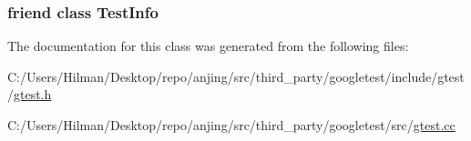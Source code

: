 \subsubsection[{Test\+Info}]{\setlength{\rightskip}{0pt plus 5cm}friend class {\bf Test\+Info}\hspace{0.3cm}{\ttfamily [friend]}}\label{classtesting_1_1_test_event_listeners_a4c49c2cdb6c328e6b709b4542f23de3c}


The documentation for this class was generated from the following files\+:\begin{DoxyCompactItemize}
\item 
C\+:/\+Users/\+Hilman/\+Desktop/repo/anjing/src/third\+\_\+party/googletest/include/gtest/\hyperlink{gtest_8h}{gtest.\+h}\item 
C\+:/\+Users/\+Hilman/\+Desktop/repo/anjing/src/third\+\_\+party/googletest/src/\hyperlink{gtest_8cc}{gtest.\+cc}\end{DoxyCompactItemize}
